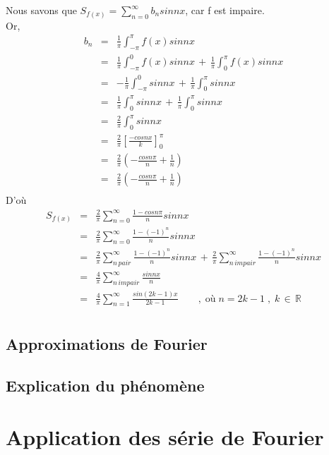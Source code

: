\documentclass[a4paper,12pt]{report}
\begin{document}
Nous savons que $S_{f(x)}=\displaystyle\sum\limits_{n=0}^{\infty} b_{n}sinnx$, car f est impaire.\\
Or, \begin{eqnarray*}
b_{n}&=&\frac{1}{\pi}\int_{-\pi}^{\pi}f(x)sinnx\\
		 &=&\frac{1}{\pi}\int_{-\pi}^{0}f(x)sinnx\,+\,\frac{1}{\pi}\int_{0}^{\pi}f(x)sinnx\\
		 &=&-\frac{1}{\pi}\int_{-\pi}^{0}sinnx\,+\,\frac{1}{\pi}\int_{0}^{\pi}sinnx\\
		 &=&\frac{1}{\pi}\int_{0}^{\pi}sinnx\,+\,\frac{1}{\pi}\int_{0}^{\pi}sinnx\\
		 &=&\frac{2}{\pi}\int_{0}^{\pi}sinnx\\
		&=&\frac{2}{\pi}\left[\frac{-cosnx}{k}\right]_0^\pi\\
		 &=&\frac{2}{\pi}\left(-\frac{cosn\pi}{n}+\frac{1}{n}\right)\\
		 &=&\frac{2}{\pi}\left(-\frac{cosn\pi}{n}+\frac{1}{n}\right)\\
	\end{eqnarray*}
D'o\`u \begin{eqnarray*}
S_{f(x)}&=&\frac{2}{\pi}\displaystyle\sum\limits_{n=0}^{\infty}\frac{1-cosn\pi}{n}sinnx\\
		&=&\frac{2}{\pi}\displaystyle\sum\limits_{n=0}^{\infty}\frac{1-(-1)^{n}}{n}sinnx\\
		&=&\frac{2}{\pi}\sum\limits_{n\,pair}^{\infty}\frac{1-(-1)^{n}}{n}sinnx\,+\,\frac{2}{\pi}\sum\limits_{n\,impair}^{\infty}\frac{1-(-1)^{n}}{n}sinnx\\
		&=&\frac{4}{\pi}\sum\limits_{n\,impair}^{\infty}\frac{sinnx}{n}\\
		&=&\frac{4}{\pi}\sum\limits_{n=1}^{\infty}\frac{sin(2k-1)x}{2k-1}\qquad,\;\text{o\`u}\;n=2k-1\;,\;k\,\in\,\pmb{\mathbb{R}}\\
	\end{eqnarray*}
\section{Approximations de Fourier}

\section{Explication du ph\'enom\`ene}

\chapter{Application des série de Fourier}
\end{document}
